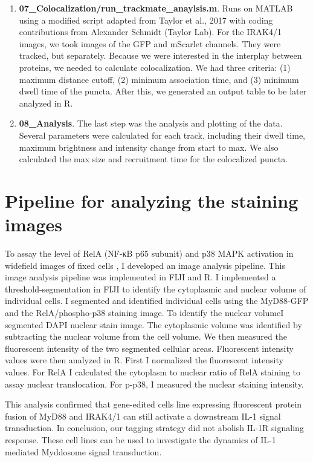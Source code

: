 \begin{enumerate}
\item \textbf{07\_Colocalization/run\_trackmate\_anaylsis.m}. Runs on MATLAB using a modified script adapted from Taylor et al., 2017 with coding contributions from Alexander Schmidt (Taylor Lab). For the IRAK4/1 images, we took images of the GFP and mScarlet channels. They were tracked, but separately. Because we were interested in the interplay between proteins, we needed to calculate colocalization. We had three criteria: (1) maximum distance cutoff, (2) minimum association time, and (3) minimum dwell time of the puncta. After this, we generated an output table to be later analyzed in R.

\item \textbf{08\_Analysis}. The last step was the analysis and plotting of the data. Several parameters were calculated for each track, including their dwell time, maximum brightness and intensity change from start to max. We also calculated the max size and recruitment time for the colocalized puncta.

\end{enumerate}

\section{Pipeline for analyzing the staining images}
To assay the level of RelA (NF-κB p65 subunit) and p38 MAPK activation in widefield images of fixed cells , I developed an image analysis pipeline. This image analysis pipeline was implemented in FIJI and R. I implemented a threshold-segmentation in FIJI to identify the cytoplasmic and nuclear volume of individual cells. I segmented and identified individual cells using the MyD88-GFP and the RelA/phospho-p38 staining image. To identify the nuclear volumeI segmented DAPI nuclear stain image. The cytoplasmic volume was identified by subtracting the nuclear volume from the cell volume. We then measured the fluorescent intensity of the two segmented cellular areas. Fluorescent intensity values were then analyzed in R. First I normalized the fluorescent intensity values. For RelA I calculated the cytoplasm to nuclear ratio of RelA staining to assay nuclear translocation. For p-p38, I measured the nuclear staining intensity.

This analysis confirmed that gene-edited cells line expressing fluorescent protein fusion of MyD88 and IRAK4/1 can still activate a downstream IL-1 signal transduction. In conclusion, our tagging strategy did not abolish IL-1R signaling response. These cell lines can be used to investigate the dynamics of IL-1 mediated Myddosome signal transduction.

